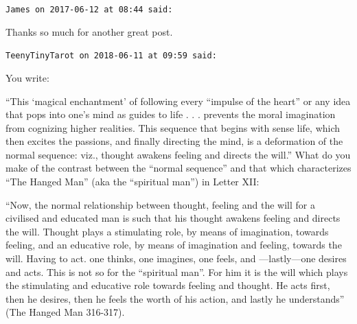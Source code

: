 \begin{footnotesize}
\begin{sffamily}
\texttt{James on 2017-06-12 at 08:44 said:}

Thanks so much for another great post.

\hfill

\texttt{TeenyTinyTarot on 2018-06-11 at 09:59 said:}

You write:

``This `magical enchantment' of following every ``impulse of the heart'' or any idea that pops into one's mind as guides to life . . . prevents the moral imagination from cognizing higher realities. This sequence that begins with sense life, which then excites the passions, and finally directing the mind, is a deformation of the normal sequence: viz., thought awakens feeling and directs the will.'' What do you make of the contrast between the ``normal sequence'' and that which characterizes ``The Hanged Man'' (aka the ``spiritual man'') in Letter XII:

``Now, the normal relationship between thought, feeling and the will for a civilised and educated man is such that his thought awakens feeling and directs the will. Thought plays a stimulating role, by means of imagination, towards feeling, and an educative role, by means of imagination and feeling, towards the will. Having to act. one thinks, one imagines, one feels, and ---lastly---one desires and acts. This is not so for the ``spiritual man''. For him it is the will which plays the stimulating and educative role towards feeling and thought. He acts first, then he desires, then he feels the worth of his action, and lastly he understands'' (The Hanged Man 316-317).

\end{sffamily}
\end{footnotesize}

